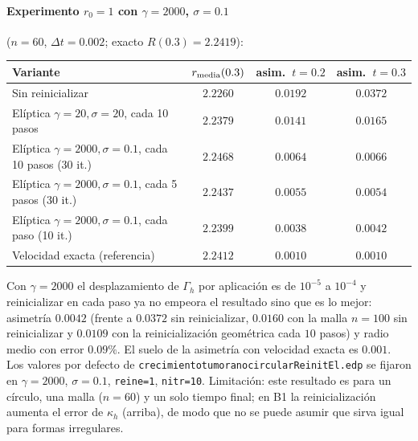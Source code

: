 \paragraph{Experimento $r_0=1$ con $\gamma=2000$, $\sigma=0.1$} ($n=60$, $\Delta t=0.002$; exacto $R(0.3)=2.2419$):
\begin{center}
\begin{tabular}{lccc}
\toprule
Variante & $r_{\rm media}(0.3)$ & asim.\ $t=0.2$ & asim.\ $t=0.3$\\
\midrule
Sin reinicializar & $2.2260$ & $0.0192$ & $0.0372$\\
Elíptica $\gamma=20,\sigma=20$, cada 10 pasos & $2.2379$ & $0.0141$ & $0.0165$\\
Elíptica $\gamma=2000,\sigma=0.1$, cada 10 pasos (30 it.) & $2.2468$ & $0.0064$ & $0.0066$\\
Elíptica $\gamma=2000,\sigma=0.1$, cada 5 pasos (30 it.) & $2.2437$ & $0.0055$ & $0.0054$\\
Elíptica $\gamma=2000,\sigma=0.1$, cada paso (10 it.) & $2.2399$ & $0.0038$ & $0.0042$\\
Velocidad exacta (referencia) & $2.2412$ & $0.0010$ & $0.0010$\\
\bottomrule
\end{tabular}
\end{center}
Con $\gamma=2000$ el desplazamiento de $\Gamma_h$ por aplicación es de $10^{-5}$ a $10^{-4}$ y reinicializar en cada paso ya no empeora el resultado sino que es lo mejor: asimetría $0.0042$ (frente a $0.0372$ sin reinicializar, $0.0160$ con la malla $n=100$ sin reinicializar y $0.0109$ con la reinicialización geométrica cada $10$ pasos) y radio medio con error $0.09\%$. El suelo de la asimetría con velocidad exacta es $0.001$. Los valores por defecto de \texttt{crecimientotumoranocircularReinitEl.edp} se fijaron en $\gamma=2000$, $\sigma=0.1$, \texttt{reine=1}, \texttt{nitr=10}. Limitación: este resultado es para un círculo, una malla ($n=60$) y un solo tiempo final; en B1 la reinicialización aumenta el error de $\kappa_h$ (arriba), de modo que no se puede asumir que sirva igual para formas irregulares.
